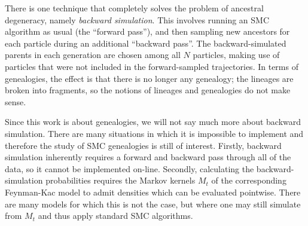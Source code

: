 There is one technique that completely solves the problem of ancestral degeneracy, namely \emph{backward simulation}\seb{[citation]}. This involves running an SMC algorithm as usual (the ``forward pass''), and then sampling new ancestors for each particle during an additional ``backward pass''. 
The backward-simulated parents in each generation are chosen among all $N$ particles, making use of particles that were not included in the forward-sampled trajectories.
In terms of genealogies, the effect is that there is no longer any genealogy; the lineages are broken into fragments, so the notions of lineages and genealogies do not make sense.

Since this work is about genealogies, we will not say much more about backward simulation. There are many situations in which it is impossible to implement and therefore the study of SMC genealogies is still of interest. 
Firstly, backward simulation inherently requires a forward and backward pass through all of the data, so it cannot be implemented on-line. 
Secondly, calculating the backward-simulation probabilities requires the Markov kernels $M_t$ of the corresponding Feynman-Kac model to admit densities which can be evaluated pointwise. There are many models for which this is not the case, but where one may still simulate from $M_t$ and thus apply standard SMC algorithms.




